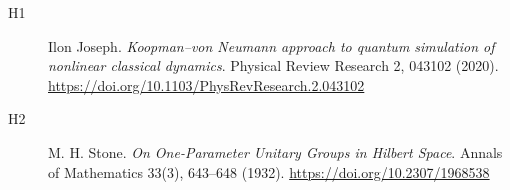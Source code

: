 \begin{description}
\item[H1] Ilon Joseph. \emph{Koopman--von Neumann approach to quantum simulation of nonlinear classical dynamics}. Physical Review Research 2, 043102 (2020). \url{https://doi.org/10.1103/PhysRevResearch.2.043102}
\item[H2] M. H. Stone. \emph{On One-Parameter Unitary Groups in Hilbert Space}. Annals of Mathematics 33(3), 643--648 (1932). \url{https://doi.org/10.2307/1968538}
\end{description}
